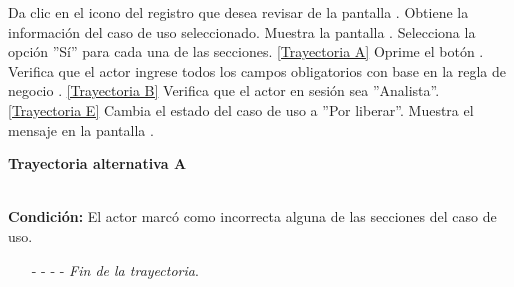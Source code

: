	\begin{UCtrayectoria}
		\UCpaso[\UCactor] Da clic en el icono  del registro que desea revisar de la pantalla .
		\UCpaso[\UCsist] Obtiene la información del caso de uso seleccionado. 
		\UCpaso[\UCsist] Muestra la pantalla .
		\UCpaso[\UCactor] Selecciona la opción ''Sí'' para cada una de las secciones. \hyperlink{CU12-5:TAA}{[Trayectoria A]} \label{CU12.5-P5}
		\UCpaso[\UCactor] Oprime el botón . \label{CU12.5-P6}
		\UCpaso[\UCsist] Verifica que el actor ingrese todos los campos obligatorios con base en la regla de negocio . \hyperlink{CU12-5:TAB}{[Trayectoria B]}
		\UCpaso[\UCsist] Verifica que el actor en sesión sea ''Analista''. \hyperlink{CU12-5:TAE}{[Trayectoria E]}
		\UCpaso[\UCsist] Cambia el estado del caso de uso a ''Por liberar''.
		\UCpaso[\UCsist] Muestra el mensaje  en la pantalla . \label{CU12.5-P12}
	\end{UCtrayectoria}		
\hypertarget{CU12-5:TAA}{\textbf{Trayectoria alternativa A}}\\
\noindent \textbf{Condición:} El actor marcó como incorrecta alguna de las secciones del caso de uso.
\begin{enumerate}
	\UCpaso[\UCsist] Muestra el campo correspondiente a las observaciones de aquellas secciones en las que se hayan marcado como incorrecta.
	\UCpaso[\UCactor] Ingresa las observaciones en los campos. \label{CU12.5-TAP2}
	\UCpaso[\UCsist] Verifica que el actor ingrese todos los campos obligatorios con base en la regla de negocio . \hyperlink{CU12-5:TAB}{[Trayectoria B]}
	\UCpaso[\UCsist] Verifica que los datos ingresados cumpla con la longitud correcta, con base en la regla de negocio . \hyperlink{CU12-5:TAC}{[Trayectoria C]}
	\UCpaso[\UCsist] Verifica que los datos ingresados cumplan con el formato requerido, con base en la regla de negocio . \hyperlink{CU12-5:TAD}{[Trayectoria D]}
	\UCpaso[\UCsist] Persiste las observaciones realizadas a cada sección marcada como incorrecta.
	\UCpaso[\UCsist] Cambia el estado del caso de uso a ''Pendiente de corrección''.
	\UCpaso  Continúa en el paso \ref{CU12.5-P12} de la trayectoria principal.
	\item[- -] - - {\em {Fin de la trayectoria}}.%
\end{enumerate}
